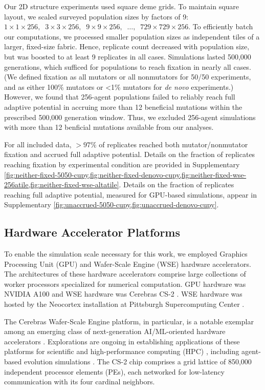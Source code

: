 Our 2D structure experiments used square deme grids.
To maintain square layout, we scaled surveyed population sizes by factors of 9: $1 \times 1 \times 256,\;\; 3 \times 3 \times 256,\;\; 9 \times 9 \times 256,\;\; \ldots,\;\; 729 \times 729 \times 256$.
To efficiently batch our computations, we processed smaller population sizes as independent tiles of a larger, fixed-size fabric.
Hence, replicate count decreased with population size, but was boosted to at least 9 replicates in all cases.
Simulations lasted 500,000 generations, which sufficed for populations to reach fixation in nearly all cases.
(We defined fixation as all mutators or all nonmutators for 50/50 experiments, and as either 100\% mutators or <1\% mutators for \textit{de novo} experiments.)
However, we found that 256-agent populations failed to reliably reach full adaptive potential in accruing more than 12 beneficial mutations within the prescribed 500,000 generation window.
Thus, we excluded 256-agent simulations with more than 12 benficial mutations available from our analyses.

For all included data, $>97\%$ of replicates reached both mutator/nonmutator fixation and accrued full adaptive potential.
Details on the fraction of replicates reaching fixation by experimental condition are provided in Supplementary \cref{fig:neither-fixed-5050-cupy,fig:neither-fixed-denovo-cupy,fig:neither-fixed-wse-256atile,fig:neither-fixed-wse-altatile}.
Details on the fraction of replicates reaching full adaptive potential, measured for GPU-based simulations, appear in Supplementary \cref{fig:unaccrued-5050-cupy,fig:unaccrued-denovo-cupy}.

\subsection{Hardware Accelerator Platforms} \label{sec:hardware}

To enable the simulation scale necessary for this work, we employed Graphics Processing Unit (GPU) and Wafer-Scale Engine (WSE) hardware accelerators.
The architectures of these hardware accelerators comprise large collections of worker processors specialized for numerical computation.
GPU hardware was NVIDIA A100 and WSE hardware was Cerebras CS-2 \citep{choquette2021nvidia,cerebras2021wafer}.
WSE hardware was hosted by the Neocortex installation at Pittsburgh Supercomputing Center \citep{buitrago2021neocortex}.

The Cerebras Wafer-Scale Engine platform, in particular, is a notable exemplar among an emerging class of next-generation AI/ML-oriented hardware accelerators \citep{lauterbach2021path}.
Explorations are ongoing in establishing applications of these platforms for scientific and high-performance computing (HPC) \citep{rocki2020fast,brown2023exploring,ltaief2023scaling,sai2023massively,brown2022distributed,luow2020using,woo2022distributed,tramm2024efficient,chen2024using,phillips2023solving,chen2024solving}, including agent-based evolution simulations \citep{moreno2024trackable}.
The CS-2 chip comprises a grid lattice of 850,000 independent processor elements (PEs), each networked for low-latency communication with its four cardinal neighbors.

